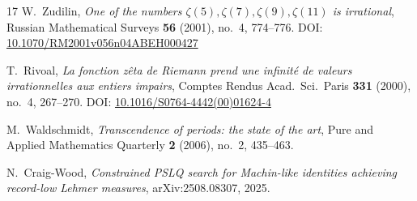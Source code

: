 \documentclass[11pt]{amsart}
\theoremstyle{remark}
\begin{document}
\begin{thebibliography}{17}
W.~Zudilin,
\emph{One of the numbers $\zeta(5), \zeta(7), \zeta(9), \zeta(11)$ is irrational},
Russian Mathematical Surveys \textbf{56} (2001), no.~4, 774--776.
\newline DOI: \href{https://doi.org/10.1070/RM2001v056n04ABEH000427}%
{10.1070/RM2001v056n04ABEH000427}

T.~Rivoal,
\emph{La fonction z\^eta de Riemann prend une infinit\'e de valeurs
irrationnelles aux entiers impairs},
Comptes Rendus Acad.\ Sci.\ Paris \textbf{331} (2000), no.~4, 267--270.
\newline DOI: \href{https://doi.org/10.1016/S0764-4442(00)01624-4}%
{10.1016/S0764-4442(00)01624-4}

M.~Waldschmidt,
\emph{Transcendence of periods: the state of the art},
Pure and Applied Mathematics Quarterly \textbf{2} (2006), no.~2, 435--463.

N.~Craig-Wood,
\emph{Constrained PSLQ search for Machin-like identities achieving record-low Lehmer
measures},
arXiv:2508.08307, 2025.

\end{thebibliography}
\end{document}
